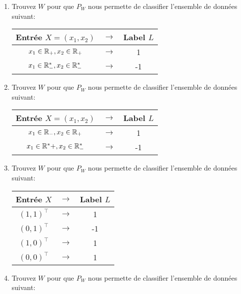 \documentclass{my_class}%
\begin{document}
\begin{enumerate}
\item Trouvez $W$ pour que $ P_W$ nous permette de classifier l'ensemble de données suivant:
 
\begin{center}
 {\normalsize
\begin{tabular}{|ccc|} \hline
Entrée $X=(x_1,x_2)$&$\mathbf{\rightarrow}$ & Label $L$  \\[5pt] \hline
$ {x_1\in \mathbb{R} _+, x_2\in \mathbb{R} _+}$ & $\mathbf{\rightarrow}$ & 1 \\[5pt] \hline
$ {x_1\in \mathbb{R} ^*_-, x_2\in \mathbb{R} ^*_-}$ & $\mathbf{\rightarrow}$ & -1 \\[5pt] \hline
\end{tabular}
}
\end{center}
% 
\item Trouvez $W$ pour que $ P_W$ nous permette de classifier l'ensemble de données suivant:
 
\begin{center}
 {\normalsize
\begin{tabular}{|ccc|} \hline
Entrée $X=(x_1,x_2)$&$\mathbf{\rightarrow}$ & Label $L$  \\[5pt] \hline
$ {x_1\in \mathbb{R} _-, x_2\in \mathbb{R} _+}$ & $\mathbf{\rightarrow}$ & 1 \\[5pt] \hline
$ {x_1\in \mathbb{R} ^*+, x_2\in \mathbb{R} ^*_-}$ & $\mathbf{\rightarrow}$ & -1 \\[5pt] \hline
\end{tabular}
}
\end{center}
%
\item Trouvez $W$ pour que $ P_W$ nous permette de classifier l'ensemble de données suivant:
 
\begin{center}
 {\normalsize
\begin{tabular}{|ccc|} \hline
Entrée $X$&$\mathbf{\rightarrow}$ & Label $L$  \\[5pt] \hline
$ {  (1,1)^\top}$ & $\mathbf{\rightarrow}$ & 1 \\[5pt] \hline
$ { (0,1)^\top}$ & $\mathbf{\rightarrow}$ & -1 \\[5pt] \hline
$ { (1,0)^\top}$ & $\mathbf{\rightarrow}$ & 1 \\[5pt] \hline
$ { (0,0)^\top}$ & $\mathbf{\rightarrow}$ & 1 \\[5pt] \hline
\end{tabular}
}
\end{center}
\item Trouvez $W$ pour que $ P_W$ nous permette de classifier l'ensemble de données suivant:
 

\end{enumerate}
\end{document}
